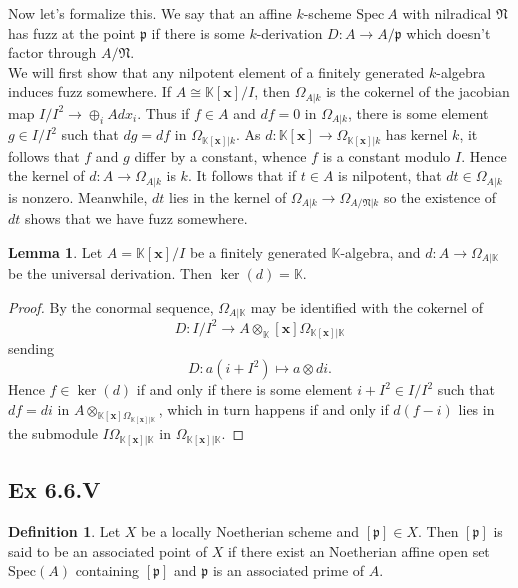 \documentclass{article}
\theoremstyle{definition}
\newtheorem{definition}[theorem]{Definition}
\newtheorem{lemma}[theorem]{Lemma}
\newcommand{\K}{\mathbb{K}}
\newcommand{\Kx}{\K[\bm{x}]}
\newcommand{\Spec}{\text{Spec}}
\begin{document}
Now let's formalize this. We say that an affine $k$-scheme $\Spec\ A$ with
nilradical $\mathfrak{N}$ has fuzz at the point $\mathfrak{p}$ if there is some
$k$-derivation $D : A \to A/\mathfrak{p}$ which doesn't factor through
$A/\mathfrak{N}$. \\

We will first show that any nilpotent element of a finitely generated
$k$-algebra induces fuzz somewhere. If $A \cong \Kx / I$, then $\Omega_{A|k}$
is the cokernel of the jacobian map $I/I^{2} \to \oplus_{i}Adx_i$. Thus if $f
	\in A$ and $df = 0$ in $\Omega_{A|k}$, there is some element $g \in I/I^{2}$
such that $dg = df$ in $\Omega_{\Kx | k}$. As $d : \Kx \to \Omega_{\Kx | k}$
has kernel $k$, it follows that $f$ and $g$ differ by a constant, whence $f$ is
a constant modulo $I$. Hence the kernel of $d : A \to \Omega_{A|k}$ is $k$. It
follows that if $t \in A$ is nilpotent, that $dt \in \Omega_{A|k}$ is nonzero.
Meanwhile, $dt$ lies in the kernel of $\Omega_{A|k} \to
	\Omega_{A/\mathfrak{N}|k}$ so the existence of $dt$ shows that we have fuzz
somewhere. \\

\begin{lemma}
	Let $A = \Kx/I$ be a finitely generated $\K$-algebra, and $d : A \to \Omega_{A \vert \K}$
	be the universal derivation. Then $\ker(d) = \K$.
\end{lemma}
\begin{proof}
	By the conormal sequence, $\Omega_{A \vert \K}$ may be identified with
	the cokernel of
	\[
		D : I/I^{2} \to A \otimes_\Kx \Omega_{\Kx \vert \K}
	\]
	sending
	\[
		D : a(i + I^{2})
		\mapsto
		a \otimes di.
	\]
	Hence $f \in \ker(d)$ if and only if there is some element $i + I^{2} \in I/I^{2}$
	such that $df = di$ in $A \otimes_{\Kx \Omega_{\Kx \vert \K}}$, which in turn
	happens if and only if $d(f - i)$ lies in the submodule $I\Omega_{\Kx \vert \K}$
	in $\Omega_{\Kx \vert \K}$.
\end{proof}

\subsection*{Ex 6.6.V}

\begin{definition}
	Let $X$ be a locally Noetherian scheme and $[\mathfrak{p}] \in X$. Then
	$[\mathfrak{p}]$ is said to be an associated point of $X$ if there exist
	an Noetherian affine open set $\Spec(A)$ containing $[\mathfrak{p}]$
	and $\mathfrak{p}$ is an associated prime of $A$. \\
\end{definition}
\end{document}
